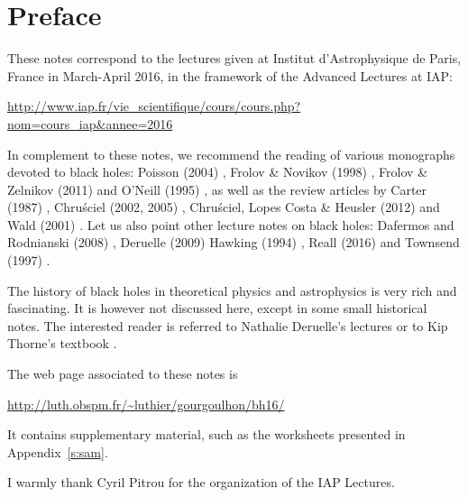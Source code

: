 \chapter*{Preface}

These notes correspond to the lectures given at
Institut d'Astrophysique de Paris, France in March-April 2016, in the
framework of the Advanced Lectures at IAP:

\centerline{\url{http://www.iap.fr/vie_scientifique/cours/cours.php?nom=cours_iap&annee=2016}}

\vspace{2ex}

In complement to these notes, we recommend the reading of various monographs
devoted to black holes: Poisson (2004) \cite{Poiss04}, Frolov \& Novikov (1998) \cite{FroloN98},
Frolov \& Zelnikov (2011) \cite{FroloZ11} and O'Neill (1995) \cite{ONeil95}, as well as the review
articles by Carter (1987) \cite{Carte87}, Chru\'sciel (2002, 2005) \cite{Chrus02, Chrus05},
Chru\'sciel, Lopes Costa \& Heusler (2012) \cite{ChrusLH12} and Wald (2001) \cite{Wald01}.
Let us also point other lecture notes on black holes:
Dafermos and Rodnianski (2008) \cite{DaferR13},  Deruelle (2009) \cite{Derue09}
Hawking (1994) \cite{Hawki94,HawkiP15}, Reall (2016) \cite{Reall16} and Townsend (1997) \cite{Towns97}.

The history of black holes in theoretical physics and astrophysics is
very rich and fascinating. It is however not discussed here, except in some
small historical notes. The interested
reader is referred to Nathalie Deruelle's lectures \cite{Derue09} or to Kip Thorne's
textbook \cite{Thorn94}.


The web page associated to these notes is

\centerline{\url{http://luth.obspm.fr/~luthier/gourgoulhon/bh16/}}

It contains supplementary material, such as the worksheets presented in
Appendix~\ref{s:sam}.

\vspace{2ex}

I warmly thank Cyril Pitrou for the organization of the IAP Lectures.
